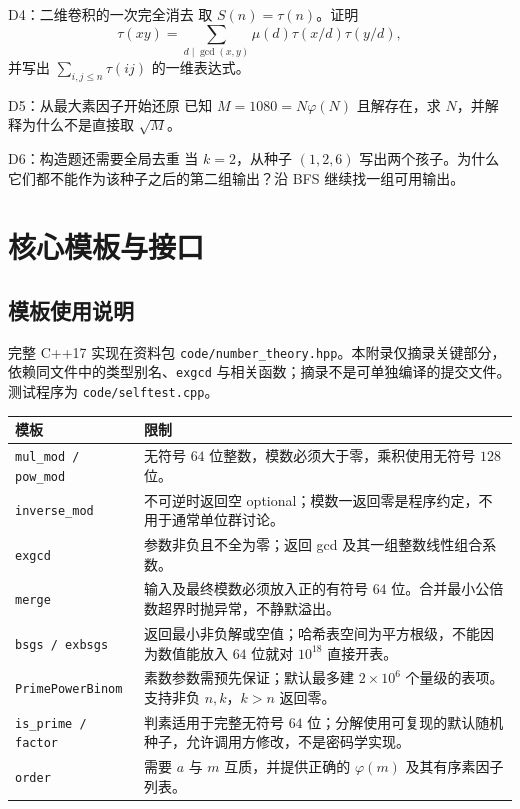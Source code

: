 \documentclass[UTF8,a4paper,11pt,oneside,openany,fontset=fandol]{ctexbook}
\theoremstyle{definition}
\begin{document}
\begin{problem}{D4：二维卷积的一次完全消去}
取 $S(n)=\tau(n)$。证明
\[
 \tau(xy)=\sum_{d\mid\gcd(x,y)}\mu(d)\tau(x/d)\tau(y/d),
\]
并写出 $\sum_{i,j\le n}\tau(ij)$ 的一维表达式。
\end{problem}


\begin{problem}{D5：从最大素因子开始还原}
已知 $M=1080=N\varphi(N)$ 且解存在，求 $N$，并解释为什么不是直接取 $\sqrt M$。
\end{problem}


\begin{problem}{D6：构造题还需要全局去重}
当 $k=2$，从种子 $(1,2,6)$ 写出两个孩子。为什么它们都不能作为该种子之后的第二组输出？沿 BFS 继续找一组可用输出。
\end{problem}






\appendix
\chapter{核心模板与接口}
\section{模板使用说明}
完整 C++17 实现在资料包 \texttt{code/number\_theory.hpp}。本附录仅摘录关键部分，依赖同文件中的类型别名、\texttt{exgcd} 与相关函数；摘录不是可单独编译的提交文件。测试程序为 \texttt{code/selftest.cpp}。

\begin{longtable}{p{}p{}}
\toprule
模板 & 限制\\\midrule
\texttt{mul\_mod / pow\_mod} & 无符号 $64$ 位整数，模数必须大于零，乘积使用无符号 $128$ 位。\\
\texttt{inverse\_mod} & 不可逆时返回空 optional；模数一返回零是程序约定，不用于通常单位群讨论。\\
\texttt{exgcd} & 参数非负且不全为零；返回 gcd 及其一组整数线性组合系数。\\
\texttt{merge} & 输入及最终模数必须放入正的有符号 $64$ 位。合并最小公倍数超界时抛异常，不静默溢出。\\
\texttt{bsgs / exbsgs} & 返回最小非负解或空值；哈希表空间为平方根级，不能因为数值能放入 $64$ 位就对 $10^{18}$ 直接开表。\\
\texttt{PrimePowerBinom} & 素数参数需预先保证；默认最多建 $2\times10^6$ 个量级的表项。支持非负 $n,k$，$k>n$ 返回零。\\
\texttt{is\_prime / factor} & 判素适用于完整无符号 $64$ 位；分解使用可复现的默认随机种子，允许调用方修改，不是密码学实现。\\
\texttt{order} & 需要 $a$ 与 $m$ 互质，并提供正确的 $\varphi(m)$ 及其有序素因子列表。\\
\bottomrule
\end{longtable}
\end{document}
